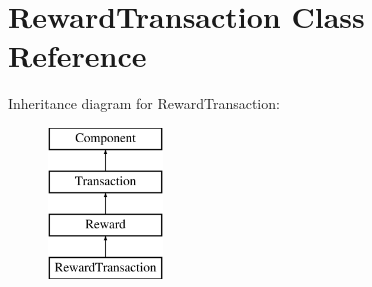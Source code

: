 \hypertarget{classRewardTransaction}{}\section{Reward\+Transaction Class Reference}
\label{classRewardTransaction}
Inheritance diagram for Reward\+Transaction\+:\begin{figure}[H]
\begin{center}
\leavevmode
\includegraphics[height=4.000000cm]{classRewardTransaction}
\end{center}
\end{figure}
